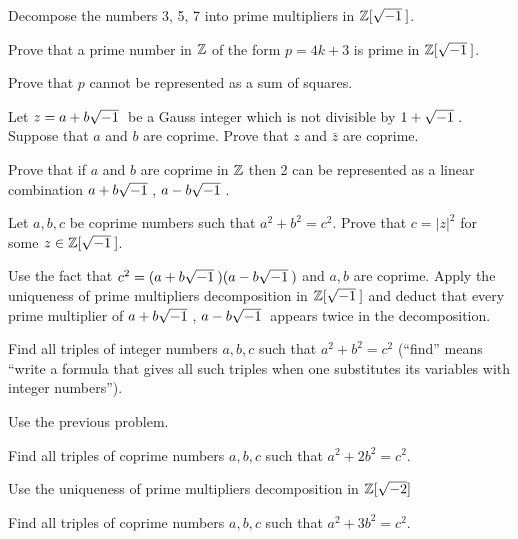 \documentclass[12pt]{article}
\begin{document}
\begin{zadacha}[*] Decompose the numbers 3, 5, 7 into prime
 multipliers in ${\mathbb Z}[\sqrt{-1}\:]$.
\end{zadacha}

\begin{zadacha}[*] Prove that a prime number in ${\mathbb Z}$ of the form $p=4k+3$
is prime in ${\mathbb Z}[\sqrt{-1}\:]$.
\end{zadacha}

\begin{ukazanie} Prove that $p$ cannot be represented as a sum of squares.
\end{ukazanie}

\begin{zadacha} Let $z= a + b \sqrt{-1}\:$ be a Gauss integer which is not
  divisible by $1 + \sqrt{-1}\:$. Suppose that $a$ and $b$ are coprime. Prove
  that $z$ and $\bar z$ are coprime. 
\end{zadacha}

\begin{ukazanie} Prove that if $a$ and $b$ are coprime in ${\mathbb Z}$
  then 2 can be represented as a linear combination $a + b \sqrt{-1}\:$, $a - b
\sqrt{-1}\:$.
\end{ukazanie}

\begin{zadacha}[!] Let $a, b, c$ be coprime numbers such that
  $a^2 + b ^2 = c^2$. Prove that $c= |z|^2$ for some $z\in{\mathbb Z}[\sqrt{-1}\:]$.
\end{zadacha}

\begin{ukazanie} Use the fact that  $c^2 = (a + b \sqrt{-1}\:)(a - b \sqrt{-1}\:)$ and 
 $a, b$ are coprime. Apply the uniqueness of prime multipliers
  decomposition in ${\mathbb Z}[\sqrt{-1}\:]$ and deduct that every prime multiplier of
  $a + b \sqrt{-1}\:$, $a - b \sqrt{-1}\:$ appears twice in the decomposition. 
\end{ukazanie}

\begin{zadacha}[!] Find all triples of integer numbers $a, b, c$ such
  that $a^2 + b ^2 = c^2$ (``find'' means ``write a formula that gives
  all such triples when one substitutes its variables with integer
  numbers'').
\end{zadacha}

\begin{ukazanie} Use the previous problem.
\end{ukazanie}

\begin{zadacha}[*] Find all triples of coprime numbers  $a, b,
c$ such that $a^2 + 2 b ^2 = c^2$.
\end{zadacha}

\begin{zadacha} Use the uniqueness of prime multipliers decomposition
  in ${\mathbb Z}[\sqrt{-2}]$
\end{zadacha}

\begin{zadacha}[**] Find all triples of coprime numbers $a, b,
  c$ such that $a^2 + 3 b ^2 = c^2$.
\end{zadacha}
\end{document}
